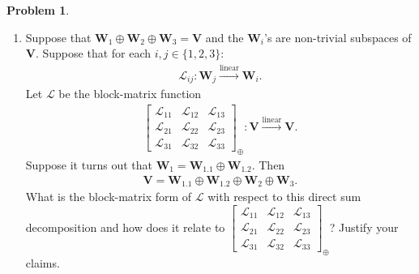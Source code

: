 \documentclass{article}
\theoremstyle{definition}
\newtheorem*{prob*}{Problem}
\newcommand{\V}{\mathbf{V}}
\newcommand{\W}{\mathbf{W}}
\newcommand{\lag}{\mathcal{L}}
\newcommand{\lin}{\overset{\text{linear}}{\longrightarrow}}
\begin{document}
\begin{prob*}
\begin{enumerate}
	\item Suppose that $\W_1\oplus\W_2\oplus\W_3 = \V$ and the $\W_i$'s are non-trivial subspaces of $\V$. Suppose that for each $i,j\in \{1,2,3\}$:
	\begin{align*}
	\lag_{ij} : \W_j \lin \W_i.
	\end{align*} 
	Let $\lag$ be the block-matrix function
	\begin{align*}
	\begin{bmatrix}
	\lag_{11} & \lag_{12} & \lag_{13}\\
	\lag_{21} & \lag_{22} & \lag_{23}\\
	\lag_{31} & \lag_{32} & \lag_{33}
	\end{bmatrix}_\oplus : \V \lin \V.
	\end{align*}
	Suppose it turns out that $\W_1 = \W_{1.1}\oplus \W_{1.2}$. Then
	\begin{align*}
	\V = \W_{1.1}\oplus \W_{1.2} \oplus \W_2 \oplus \W_3.
	\end{align*}
	What is the block-matrix form of $\lag$ with respect to this direct sum decomposition and how does it relate to $\begin{bmatrix}
	\lag_{11} & \lag_{12} & \lag_{13}\\
	\lag_{21} & \lag_{22} & \lag_{23}\\
	\lag_{31} & \lag_{32} & \lag_{33}
	\end{bmatrix}_\oplus$? Justify your claims.\\	
	\end{enumerate}



\end{prob*}
\end{document}

